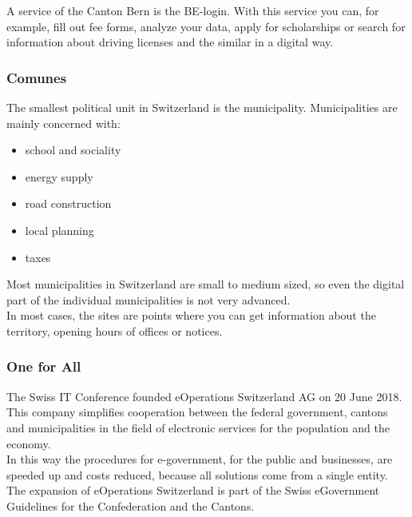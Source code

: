 A service of the Canton Bern is the BE-login. With this service you can, for example, fill out fee forms, analyze your data, apply for scholarships or search for information about driving licenses and the similar in a digital way.


\subsubsection{Comunes}
The smallest political unit in Switzerland is the municipality.
Municipalities are mainly concerned with:
\begin{itemize}
\item school and sociality
\item energy supply
\item road construction
\item local planning
\item taxes
\end{itemize}

Most municipalities in Switzerland are small to medium sized, so even the digital part of the individual municipalities is not very advanced.\\
In most cases, the sites are points where you can get information about the territory, opening hours of offices or notices.



\subsubsection{One for All}
The Swiss IT Conference founded eOperations Switzerland AG on 20 June 2018.\\
This company simplifies cooperation between the federal government, cantons and municipalities in the field of electronic services for the population and the economy. \\
In this way the procedures for e-government, for the public and businesses, are speeded up and costs reduced, because all solutions come from a single entity.\\
The expansion of eOperations Switzerland is part of the Swiss eGovernment Guidelines for the Confederation and the Cantons.\\

